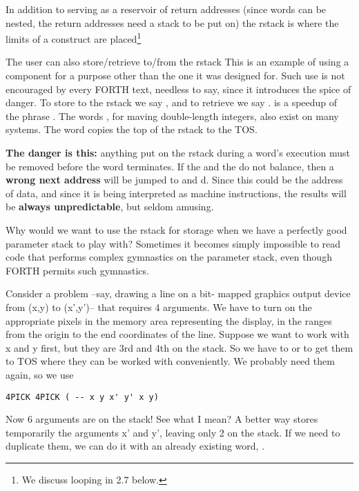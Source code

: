 In addition to serving as a reservoir of return addresses (since words can be nested, the return addresses need a stack to be put on) the rstack is where the limits of a  construct are placed\footnote{We discuss looping in 2.7 below.}

The user can also store/retrieve to/from the rstack This is an example of using a component for a purpose other than the one it was designed for. Such use is not encouraged by every FORTH text, needless to say, since it introduces the spice of danger. To store to the rstack we say , and to retrieve we say .  is a speedup of the phrase . The words  , for maving double-length integers, also exist on many systems. The word  copies the top of the rstack to the TOS.

\leftbar[1\linewidth]
\textbf{The danger is this:} anything put on the rstack during a word’s execution must be removed before the word terminates. If the  and the  do not balance, then a \textbf{wrong next address} will be jumped to and d. Since this could be the address of data, and since it is being interpreted as machine instructions, the results will be \textbf{always unpredictable}, but seldom amusing.
\endleftbar

Why would we want to use the rstack for storage when we have a perfectly good parameter stack to play with? Sometimes it becomes simply impossible to read code that performs complex gymnastics on the parameter stack, even though FORTH permits such gymnastics.

Consider a problem --say, drawing a line on a bit- mapped graphics output device from (x,y) to (x',y')-- that requires 4 arguments. We have to turn on the appropriate pixels in the memory area representing the display, in the ranges from the origin to the end coordinates of the line. Suppose we want to work with x and y first, but they are 3rd and 4th on the stack. So we have to  or  to get them to TOS where they can be worked with conveniently. We probably need them again, so we use

\begin{lstlisting}
4PICK 4PICK ( -- x y x' y' x y)
\end{lstlisting}

Now 6 arguments are on the stack! See what I mean? A better way stores temporarily the arguments x’ and y', leaving only 2 on the stack. If we need to duplicate them, we can do it with an already existing word, .

